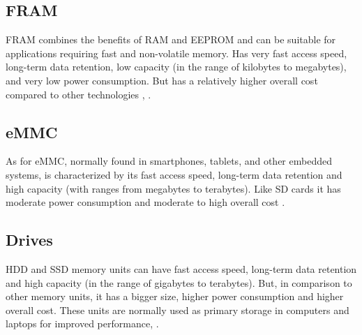 \subsection{\gls{FRAM}}
\gls{FRAM} combines the benefits of \gls{RAM} and \gls{EEPROM} and can be suitable for applications requiring fast and non-volatile memory.
Has very fast access speed, long-term data retention, low capacity (in the range of kilobytes to megabytes), and very low power consumption.
But has a relatively higher overall cost compared to other technologies \cite{mem8}, \cite{mem11}.

\subsection{\gls{eMMC}}
As for \gls{eMMC}, normally found in smartphones, tablets, and other embedded systems, is characterized by its fast access speed, long-term data retention and high capacity (with ranges from megabytes to terabytes).
Like \gls{SD} cards it has moderate power consumption and moderate to high overall cost \cite{mem11}.

\subsection{Drives}
\gls{HDD} and \gls{SSD} memory units can have fast access speed, long-term data retention and high capacity (in the range of gigabytes to terabytes).
But, in comparison to other memory units, it has a bigger size, higher power consumption and higher overall cost.
These units are normally used as primary storage in computers and laptops for improved performance, \cite{mem10}.

